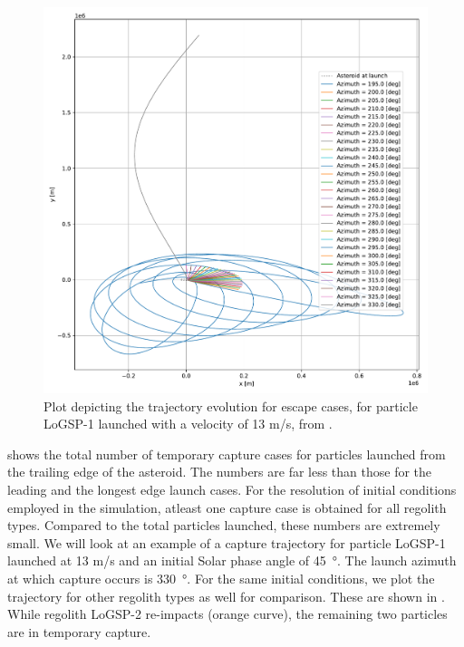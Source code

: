 \begin{figure}[htb]
\centering
\captionsetup{justification=centering}
\includegraphics[width=\textwidth, height=0.4\textheight, keepaspectratio=true]{trailing_edge_perturbations/logsp1_escape_traj_13ms_solarPhase225.pdf}
\caption{Plot depicting the trajectory evolution for escape cases, for particle LoGSP-1 launched with a velocity of 13 m/s, from \protect{}.}
\label{fig:trailingEdge_logsp1_escape_traj_13ms_solar225}
\end{figure}
\FloatBarrier
 shows the total number of temporary capture cases for particles launched from the trailing edge of the asteroid. The numbers are far less than those for the leading and the longest edge launch cases. For the resolution of initial conditions employed in the simulation, atleast one capture case is obtained for all regolith types. Compared to the total particles launched, these numbers are extremely small. We will look at an example of a capture trajectory for particle LoGSP-1 launched at 13 m/s and an initial Solar phase angle of \SI{45}{\degree}. The launch azimuth at which capture occurs is \SI{330}{\degree}. For the same initial conditions, we plot the trajectory for other regolith types as well for comparison. These are shown in . While regolith LoGSP-2 re-impacts (orange curve), the remaining two particles are in temporary capture.
